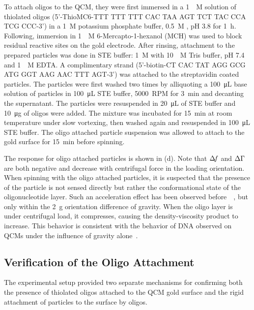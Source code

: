 To attach oligos to the QCM, they were first immersed in a
\SI{1}{\micro\textsc{M}} solution of thiolated oligos (5'-ThioMC6-TTT TTT
TTT CAC TAA AGT TCT TAC CCA TCG CCC-3') in a \SI{1}{\textsc{M}} potassium
phosphate buffer, \SI{0.5}{\textsc{M}} , pH 3.8 for
\SI{1}{\hour}.  Following, immersion in \SI{1}{\milli\textsc{M}}
6-Mercapto-1-hexanol (MCH) was used to block residual reactive sites on the
gold electrode.  After rinsing, attachment to the prepared particles was
done in STE buffer: \SI{1}{\textsc{M}}  with
\SI{10}{\milli\textsc{M}} Tris buffer, pH 7.4 and \SI{1}{\milli\textsc{M}}
EDTA\@.  A complimentary strand (5'-biotin-CT CAC TAT AGG GCG ATG GGT AAG
AAC TTT AGT-3') was attached to the streptavidin coated particles.  The
particles were first washed two times by alliquoting a
\SI{100}{\micro\liter} base solution of particles in \SI{100}{\micro\liter}
STE buffer, \SI{5000}{RPM} for \SI{3}{\minute} and decanting the
supernatant.  The particles were resuspended in \SI{20}{\micro\liter} of
STE buffer and \SI{10}{\micro\gram} of oligos were added.  The mixture was
incubated for \SI{15}{\minute} at room temperature under slow vortexing,
then washed again and resuspended in \SI{100}{\micro\liter} STE buffer.
The oligo attached particle suspension was allowed to attach to the gold
surface for \SI{15}{\minute} before spinning.

The response for oligo attached particles is shown in
(d).  Note that $\Delta\!f$ and $\Delta\Gamma$ are both negative and
decrease with centrifugal force in the loading orientation.  When spinning
with the oligo attached particles, it is suspected that the presence of the
particle is not sensed directly but rather the conformational state of the
oligonucleotide layer.  Such an acceleration effect has been observed
before~\cite{yoshimoto2002effect}~\cite{fawcett2004evidence}, but only
within the \SI{2}{g} orientation difference of gravity.  When the oligo
layer is under centrifugal load, it compresses, causing the
density-viscosity product to increase.  This behavior is consistent with
the behavior of DNA observed on QCMs under the influence of gravity
alone~\cite{fawcett2004evidence}.

\subsection{Verification of the Oligo Attachment}
The experimental setup provided two separate mechanisms for confirming both
the presence of thiolated oligos attached to the QCM gold surface and the
rigid attachment of particles to the surface by oligos.

